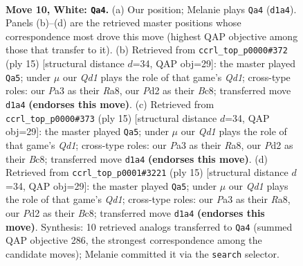 \documentclass[11pt]{article}
\begin{document}
\clearpage

\begin{figure}[p]\centering
\begin{subfigure}{0.46\textwidth}\centering
\resizebox{\linewidth}{!}{%
\newchessgame
\chessboard[
  setfen={r1bq1rk1/pp1pppbp/2n3p1/2p4n/2P5/P1N2NP1/1P1PPPBP/R1BQ1RK1 w - - 5 10},
  showmover=false,
  pgfstyle=straightmove, color=movearrow, markmove={d1-a4}
]}
\caption{}
\end{subfigure}\hfill
\begin{subfigure}{0.46\textwidth}\centering
\resizebox{\linewidth}{!}{%
\newchessgame
\chessboard[
  setfen={r1bq1rk1/pp1pppbp/2n2np1/8/2PN4/2N3P1/PP2PPBP/R1BQ1RK1 b - - 6 8},
  showmover=false,
  pgfstyle=straightmove, color=movearrow, markmove={d8-a5}
]}
\caption{}
\end{subfigure}
\\[4pt]
\begin{subfigure}{0.46\textwidth}\centering
\resizebox{\linewidth}{!}{%
\newchessgame
\chessboard[
  setfen={r1bq1rk1/pp1pppbp/2n2np1/8/2PN4/2N3P1/PP2PPBP/R1BQ1RK1 b - - 6 8},
  showmover=false,
  pgfstyle=straightmove, color=movearrow, markmove={d8-a5}
]}
\caption{}
\end{subfigure}\hfill
\begin{subfigure}{0.46\textwidth}\centering
\resizebox{\linewidth}{!}{%
\newchessgame
\chessboard[
  setfen={r1bq1rk1/pp1pppbp/2n2np1/8/2PN4/2N3P1/PP2PPBP/R1BQ1RK1 b - - 4 8},
  showmover=false,
  pgfstyle=straightmove, color=movearrow, markmove={d8-a5}
]}
\caption{}
\end{subfigure}
\caption{\textbf{Move 10, White: \texttt{Qa4}.} (a) Our position; Melanie plays \texttt{Qa4} (\texttt{d1a4}). Panels (b)--(d) are the retrieved master positions whose correspondence most drove this move (highest QAP objective among those that transfer to it). (b) Retrieved from \texttt{ccrl\_top\_p0000\#372} (ply 15) [structural distance $d$=34, QAP obj=29]: the master played \texttt{Qa5}; under $\mu$ our \emph{Qd1} plays the role of that game's \emph{Qd1}; cross-type roles: our \emph{P}a3 as their \emph{R}a8, our \emph{P}d2 as their \emph{B}c8; transferred move \texttt{d1a4} \textbf{(endorses this move)}. (c) Retrieved from \texttt{ccrl\_top\_p0000\#373} (ply 15) [structural distance $d$=34, QAP obj=29]: the master played \texttt{Qa5}; under $\mu$ our \emph{Qd1} plays the role of that game's \emph{Qd1}; cross-type roles: our \emph{P}a3 as their \emph{R}a8, our \emph{P}d2 as their \emph{B}c8; transferred move \texttt{d1a4} \textbf{(endorses this move)}. (d) Retrieved from \texttt{ccrl\_top\_p0001\#3221} (ply 15) [structural distance $d$=34, QAP obj=29]: the master played \texttt{Qa5}; under $\mu$ our \emph{Qd1} plays the role of that game's \emph{Qd1}; cross-type roles: our \emph{P}a3 as their \emph{R}a8, our \emph{P}d2 as their \emph{B}c8; transferred move \texttt{d1a4} \textbf{(endorses this move)}. Synthesis: 10 retrieved analogs transferred to \texttt{Qa4} (summed QAP objective 286, the strongest correspondence among the candidate moves); Melanie committed it via the \texttt{search} selector.}
\label{fig:thought-m18}
\end{figure}
\end{document}
